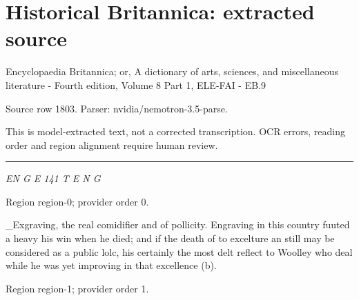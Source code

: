 \documentclass[11pt]{article}
\begin{document}
\section*{Historical Britannica: extracted source}
Encyclopaedia Britannica; or, A dictionary of arts, sciences, and miscellaneous literature - Fourth edition, Volume 8 Part 1, ELE-FAI - EB.9\par
{\small Source row 1803. Parser: nvidia/nemotron-3.5-parse.\par}
{\small This is model-extracted text, not a corrected transcription. OCR errors, reading order and region alignment require human review.\par}
\hrule\medskip
{\small\itshape EN G E 141 T E N G\par}

{\scriptsize\color{gray} Region region-0; provider order 0.\par}
\medskip

\_Exgraving, the real comidifier and of pollicity. Engraving in this country fuuted a heavy his win when he died; and if the death of to excelture an still may be considered as a public lolc, his certainly the most delt reflect to Woolley who deal while he was yet improving in that excellence (b).
\par

{\scriptsize\color{gray} Region region-1; provider order 1.\par}
\medskip
\end{document}
